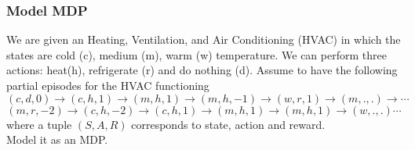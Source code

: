 
\subsubsection{Model MDP}
    We are given an Heating, Ventilation, and Air Conditioning (HVAC) in which the states are cold (c), medium (m), warm (w) temperature. We can perform three actions: heat(h), refrigerate (r) and do nothing (d). Assume to have the following partial episodes for the HVAC functioning
    $$(c,d,0)\rightarrow(c,h,1)\rightarrow(m,h,1)\rightarrow(m,h,-1)\rightarrow(w,r,1)\rightarrow(m,.,.)\rightarrow\cdots$$
    $$(m,r,-2)\rightarrow(c,h,-2)\rightarrow(c,h,1)\rightarrow(m,h,1)\rightarrow(m,h,1)\rightarrow(w,.,.)\cdots$$
    where a tuple $(S,A,R)$ corresponds to state, action and reward.\\
    Model it as an MDP.

